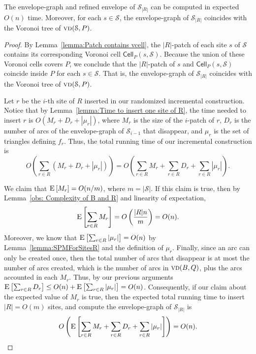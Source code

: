 \documentclass[a4paper,UKenglish]{socg-lipics-v2018}
\newcommand{\icell}[1][i]{${#1}$-patch\xspace}
\newcommand{\s}{\mathcal S}
\newcommand{\cell}[2][P]{\ensuremath{\mathsf{Cell}_{\scriptscriptstyle #1}(#2)}}
\newcommand{\vd}[2][P]{\textsc{vd}(#2, #1)}
\newcommand{\ex}[1]{\textsc{E}\left[#1\right]}
\begin{document}
\begin{theorem}
The envelope-graph and refined envelope of $\s_{|R|}$ can be computed in expected $O(n)$ time.
Moreover, for each $s\in \s$, the envelope-graph of $\s_{|R|}$ coincides with the Voronoi tree of $\vd{\s}$.
\end{theorem}
\begin{proof}
By Lemma~\ref{lemma:Patch contains vcell}, the \icell[|R|] of each site $s$ of $\s$ contains its corresponding Voronoi cell $\cell{s, \s}$. 
Because the union of these Voronoi cells covers $P$, we conclude that the \icell[|R|] of $s$ and $\cell{s, \s}$ coincide inside $P$ for each $s\in \s$.
That is, the envelope-graph of $\s_{|R|}$ coincides with the Voronoi tree of $\vd{\s}$.

Let $r$ be the $i$-th site of $R$ inserted in our randomized incremental construction. 
Notice that by Lemma~\ref{lemma:Time to insert one site of R}, 
the time needed to insert $r$ is $O(M_r + D_r + |\mu_r|)$, where $M_r$ is the size of the \icell of $r$, $D_r$ is the number of arcs of the envelope-graph of $\s_{i-1}$ that disappear, and $\mu_r$ is the set of triangles defining $f_r$. 
Thus, the total running time of our incremental construction is 
\[ O\left(\sum_{r\in R} (M_r + D_r + |\mu_r|) \right ) = O\left( \sum_{r\in R} M_r + \sum_{r\in R} D_r + \sum_{r\in R} |\mu_r|\right). \]



We claim that $\ex{M_r} = O(n/m)$, where $m = |\s|$.
If this claim is true, then by Lemma~\ref{obs: Complexity of B and R} and linearity of expectation, 
\[\ex{\sum_{r\in R} M_r} = O\left(\frac{|R| n}{m}\right) =  O(n).\]
Moreover, we know that $\ex{\sum_{r\in R} |\mu_r|} = O(n)$ by Lemma~\ref{lemma:SPMForSitesR} and the definition of $\mu_r$.
Finally, since an arc can only be created once, then the total number of arcs that disappear is at most the number of arcs created, which is the number of arcs in $\vd[Q]{B}$, plus the arcs accounted in each $M_r$. Thus, by our previous arguments $\ex{\sum_{r\in R} D_r}  \leq  O(n) + \ex{\sum_{r\in R} |\mu_r|} = O(n)$.
Consequently, if our claim about the expected value of $M_r$ is true, then the expected total running time to insert $|R| = O(m)$ sites, and compute the envelope-graph of $\s_{|R|}$ is 
\[O\left( \ex{\sum_{r\in R} M_r + \sum_{r\in R} D_r + \sum_{r\in R} |\mu_r|}\right) = O(n).\]


\end{proof}
\end{document}
